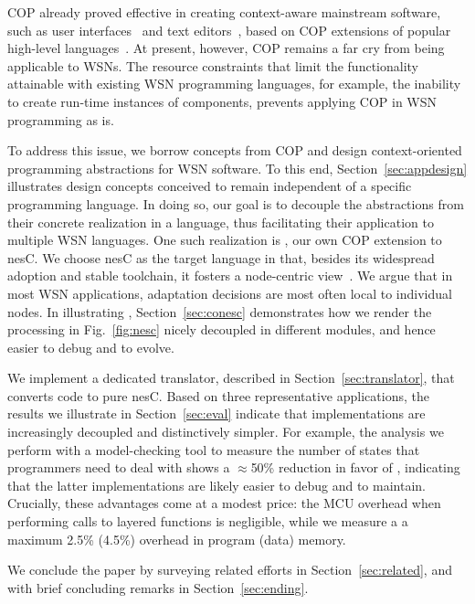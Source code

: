 COP already proved effective in creating context-aware mainstream
software, such as user interfaces~\cite{Keays03} and text
editors~\cite{Kamina11}, based on COP extensions of popular high-level
languages~\cite{Salvaneschi12}. At present, however, COP remains a far
cry from being applicable to WSNs. The resource constraints
that limit the functionality attainable with existing WSN programming
languages, for example, the inability to create run-time instances of
components, prevents applying COP in WSN programming as is.

To address this issue, we borrow concepts from COP and design
context-oriented programming abstractions for WSN software. To this
end, Section~\ref{sec:appdesign} illustrates design concepts conceived
to remain independent of a specific programming language. In doing so,
our goal is to decouple the abstractions from their concrete
realization in a language, thus facilitating their application to
multiple WSN languages. One such realization is \conesc, our own COP
extension to nesC. We choose nesC as the target language in that,
besides its widespread adoption and stable toolchain, it fosters a
node-centric view~\cite{mottola10:survey}. We argue that in most WSN
applications, adaptation decisions are most often local to individual
nodes. In illustrating \conesc, Section~\ref{sec:conesc} 
demonstrates how we render the processing in Fig.~\ref{fig:nesc} nicely
decoupled in different modules, and hence easier to debug and to
evolve.

We implement a dedicated translator, described in
Section~\ref{sec:translator}, that converts \conesc code to pure nesC.
Based on three representative applications, the results we illustrate
in Section~\ref{sec:eval} indicate that \conesc implementations are
increasingly decoupled and distinctively simpler. For example, the
analysis we perform with a model-checking tool to measure the number
of states that programmers need to deal with shows a $\approx$50\%
reduction in favor of \conesc, indicating that the latter
implementations are likely easier to debug and to maintain. Crucially,
these advantages come at a modest price: the MCU overhead when
performing calls to layered functions is negligible, while we measure
a a maximum 2.5\% (4.5\%) overhead in program (data) memory.

We conclude the paper by surveying related efforts in
Section~\ref{sec:related}, and with brief concluding remarks in
Section~\ref{sec:ending}.




